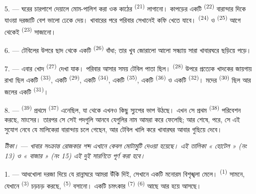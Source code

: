 \VUsaut{4.6mm}
\VUsaut{3.0mm}

5. --- ঘরের চারপাশে দেয়ালে মোম-পালিশ করা ওক কাঠের 
\textsuperscript{(21)} লাগানো। কাপড়ের একটি 
\textsuperscript{(22)} বারান্দার দিকে যাওয়া দরজাটি বেশ ভালো ঢেকে দেয়। খাবারের
পরে পরিবার সেখানেই কফি খেতে যাবে।  \textsuperscript{(24)} ও
 \textsuperscript{(25)} আগে থেকেই 
\textsuperscript{(23)} সাজানো।

6. --- টেবিলের উপরে ছাদ থেকে একটি  \textsuperscript{(26)}
বাঁধা; তার খুব জোরালো আলো সন্ধ্যায় সারা খাবারঘরে ছড়িয়ে পড়ে।

7. --- এবার খোদ  \textsuperscript{(27)} দেখা যাক। পরিবার
আসার সময় টেবিল পাতা ছিল।  \textsuperscript{(28)} উপরে
প্রত্যেক খাদকের জায়গায় রাখা ছিল একটি  \textsuperscript{(33)},
একটি  \textsuperscript{(29)}, একটি 
\textsuperscript{(34)}, একটি  \textsuperscript{(35)}, একটি
 \textsuperscript{(36)} ও একটি  \textsuperscript{(32)}।
মদের  \textsuperscript{(30)} ছিল আর জলের একটি 
\textsuperscript{(31)}।

8. ---  \textsuperscript{(39)} প্রথমে 
\textsuperscript{(37)} এনেছিল, যা থেকে এখনও কিছু স্যুপের ভাপ উঠছে। এখন সে প্রথম
 \textsuperscript{(38)} পরিবেশন করছে, মাংসের। তারপর সে সেই পদগুলি
আনবে যেগুলির নাম আমরা করে ফেলেছি; আর শেষে,  পরে, সে এই
সুযোগ নেবে যে মালিকেরা বারান্দায় চলে গেছেন, আর টেবিল খালি করে খাবারঘর আবার
গুছিয়ে দেবে।

\textit{টীকা।} --- \textit{খাবার সংক্রান্ত রোজকার শব্দ এখানে কেবল মোটামুটি
দেওয়া হয়েছে। এই তালিকা « হোটেল » (নং 13) ও « বাজার » (নং 15) এই দুই
সারণিতে পূর্ণ করা হবে।}

\VUsaut{4.6mm}
\VUsaut{3.0mm}

1. --- আধখোলা দরজা দিয়ে যে রান্নাঘরে আমরা উঁকি দিই, সেখানে একটি মনোরম
বিশৃঙ্খলা মেলে।  \textsuperscript{(1)} সামনে, যেখানে
 \textsuperscript{(3)} চড়চড় করছে, 
\textsuperscript{(5)} বসানো। একটি চমৎকার  \textsuperscript{(7)}
 \textsuperscript{(6)} আছে আর হয়ে আসছে।

